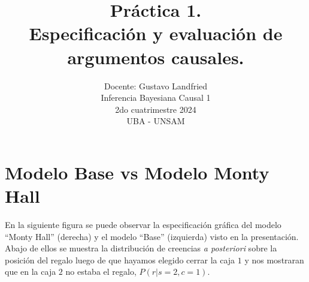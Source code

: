 \documentclass[a4paper,10pt]{article}
\title{Práctica 1. \\ Especificación y evaluación de argumentos causales.}
\author{Docente: Gustavo Landfried \\ Inferencia Bayesiana Causal 1\\ 2do cuatrimestre  2024 \\ UBA - UNSAM}
\date{}
\begin{document}
\maketitle

\tableofcontents

\newpage

\section{Modelo Base vs Modelo Monty Hall}

En la siguiente figura se puede observar la especificación gráfica del modelo ``Monty Hall'' (derecha) y el modelo ``Base'' (izquierda) visto en la presentación.
Abajo de ellos se muestra la distribución de creencias \textit{a posteriori} sobre la posición del regalo luego de que hayamos elegido cerrar la caja $1$ y nos mostraran que en la caja $2$ no estaba el regalo, $P(r|s=2,c=1)$.
\end{document}
